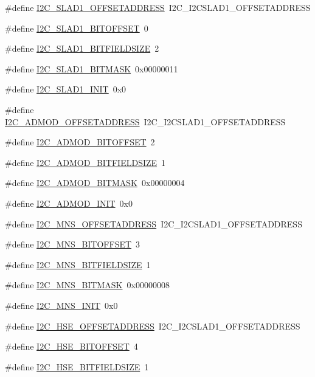 \begin{DoxyCompactItemize}
\#define \hyperlink{a00558_ab82ab6cd3ba1f49a8244ae11ab263222}{I2C\_\-SLAD1\_\-OFFSETADDRESS}~I2C\_\-I2CSLAD1\_\-OFFSETADDRESS
\item 
\#define \hyperlink{a00558_a930605870b0410b9281973215222dcf1}{I2C\_\-SLAD1\_\-BITOFFSET}~0
\item 
\#define \hyperlink{a00558_a62ec92680167acf2a29a0c655f445aef}{I2C\_\-SLAD1\_\-BITFIELDSIZE}~2
\item 
\#define \hyperlink{a00558_a8b67d75013594f5217ea239b66dba3e5}{I2C\_\-SLAD1\_\-BITMASK}~0x00000011
\item 
\#define \hyperlink{a00558_a3c0fafeb95e1ef3fa29f84ee802186da}{I2C\_\-SLAD1\_\-INIT}~0x0
\item 
\#define \hyperlink{a00558_a075d33d29fac97a63794946ac5dc468e}{I2C\_\-ADMOD\_\-OFFSETADDRESS}~I2C\_\-I2CSLAD1\_\-OFFSETADDRESS
\item 
\#define \hyperlink{a00558_ad465e667f372d3abb491c85bf2de61fc}{I2C\_\-ADMOD\_\-BITOFFSET}~2
\item 
\#define \hyperlink{a00558_ae3ecf6672c93accfe0e62c927e91d19a}{I2C\_\-ADMOD\_\-BITFIELDSIZE}~1
\item 
\#define \hyperlink{a00558_ae33b3604e87610271228bfe4e2e17f51}{I2C\_\-ADMOD\_\-BITMASK}~0x00000004
\item 
\#define \hyperlink{a00558_add5821383f488bbee780c322033f1930}{I2C\_\-ADMOD\_\-INIT}~0x0
\item 
\#define \hyperlink{a00558_a0406fc3fbcec4185b8b23409b1afdb57}{I2C\_\-MNS\_\-OFFSETADDRESS}~I2C\_\-I2CSLAD1\_\-OFFSETADDRESS
\item 
\#define \hyperlink{a00558_a9a7286e83417c9f6a0d1173b140e4af6}{I2C\_\-MNS\_\-BITOFFSET}~3
\item 
\#define \hyperlink{a00558_a04a6edbd066ec38abbc10af5d5d0a8b8}{I2C\_\-MNS\_\-BITFIELDSIZE}~1
\item 
\#define \hyperlink{a00558_a7228d938b84af17d2d41624ec7139d2e}{I2C\_\-MNS\_\-BITMASK}~0x00000008
\item 
\#define \hyperlink{a00558_a96d0655a4cb1eb8f742ae868fbd8e0f0}{I2C\_\-MNS\_\-INIT}~0x0
\item 
\#define \hyperlink{a00558_abb6821dbb196351a15b597d25d0def0d}{I2C\_\-HSE\_\-OFFSETADDRESS}~I2C\_\-I2CSLAD1\_\-OFFSETADDRESS
\item 
\#define \hyperlink{a00558_acaf102d531786d1f4ae31649c5fbe717}{I2C\_\-HSE\_\-BITOFFSET}~4
\item 
\#define \hyperlink{a00558_a9cb5cd68d84649e9c4c1282f166ed884}{I2C\_\-HSE\_\-BITFIELDSIZE}~1
\item 

\end{DoxyCompactItemize}
